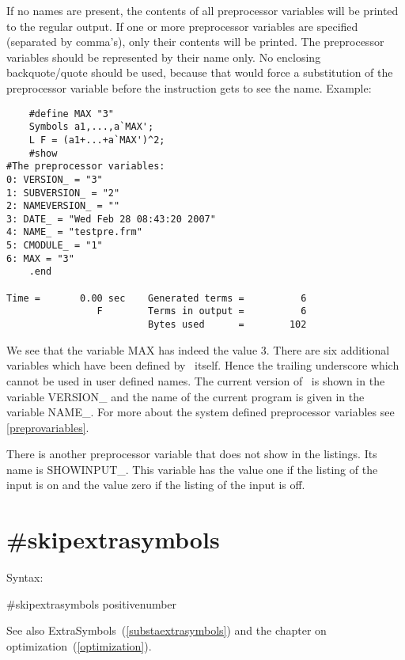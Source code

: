 \noindent If no names are present, the contents of all 
preprocessor variables will be printed to the 
regular output. If one or more preprocessor variables are specified 
(separated by comma's), only their contents will be printed. The 
preprocessor variables should be represented by their name only. No 
enclosing backquote/quote should be used, because that would force a 
substitution of the preprocessor variable before the instruction gets to 
see the name. Example:
\begin{verbatim}
    #define MAX "3"
    Symbols a1,...,a`MAX';
    L F = (a1+...+a`MAX')^2;
    #show
#The preprocessor variables:
0: VERSION_ = "3"
1: SUBVERSION_ = "2"
2: NAMEVERSION_ = ""
3: DATE_ = "Wed Feb 28 08:43:20 2007"
4: NAME_ = "testpre.frm"
5: CMODULE_ = "1"
6: MAX = "3"
    .end

Time =       0.00 sec    Generated terms =          6
                F        Terms in output =          6
                         Bytes used      =        102
\end{verbatim}
We see that the variable MAX has indeed the value 3. There are six 
additional variables which have been defined by \FORM\ itself. Hence the 
trailing underscore which cannot be used in user defined names. The current 
version of \FORM\ is shown in the variable VERSION\_ and the 
name of the current program is given in the variable NAME\_. 
For more about the system defined preprocessor variables see 
\ref{preprovariables}.

There is another preprocessor variable that does not show in the listings. 
Its name is SHOWINPUT\_. This variable has the value one 
if the listing of the input is on and the value zero if the listing of the 
input is off.


\section{\#skipextrasymbols}
\label{preskipextrasymbols}

\noindent Syntax:

\#skipextrasymbols positivenumber

\noindent See also ExtraSymbols~(\ref{substaextrasymbols}) and the chapter 
on optimization~(\ref{optimization}).

